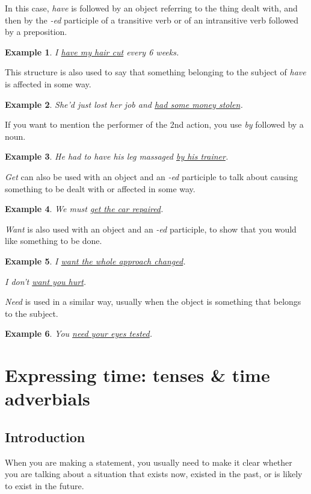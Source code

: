 \documentclass[oneside]{book}
\numberwithin{equation}{section}
\newtheorem{example}{Example}[section]
\begin{document}
In this case, \textit{have} is followed by an object referring to the thing dealt with, and then by the \textit{-ed} participle of a transitive verb or of an intransitive verb followed by a preposition.
\begin{example}
    I \underline{have my hair cut} every 6 weeks.
\end{example}
This structure is also used to say that something belonging to the subject of \textit{have} is affected in some way.
\begin{example}
    She'd just lost her job and \underline{had some money stolen}.
\end{example}
If you want to mention the performer of the 2nd action, you use \textit{by} followed by a noun.
\begin{example}
    He had to have his leg massaged \underline{by his trainer}.
\end{example}
\textit{Get} can also be used with an object and an \textit{-ed} participle to talk about causing something to be dealt with or affected in some way.
\begin{example}
    We must \underline{get the car repaired}.
\end{example}
%
\noindent{} \textit{Want} is also used with an object and an \textit{-ed} participle, to show that you would like something to be done.
\begin{example}
    I \underline{want the whole approach changed}.
    
    I don't \underline{want you hurt}.
\end{example}
\textit{Need} is used in a similar way, usually when the object is something that belongs to the subject.
\begin{example}
    You \underline{need your eyes tested}.
\end{example}


\chapter{Expressing time: tenses \& time adverbials}

\section{Introduction}
\noindent{} When you are making a statement, you usually need to make it clear whether you are talking about a situation that exists now, existed in the past, or is likely to exist in the future.
\end{document}
